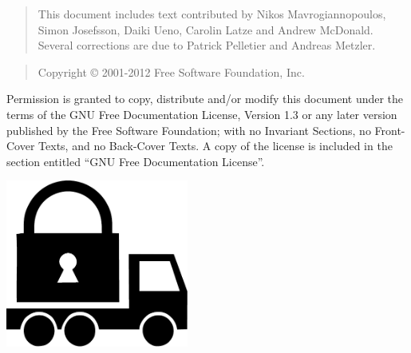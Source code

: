 \thispagestyle{empty}

\begin{quotation}
This document includes text contributed by
Nikos Mavrogiannopoulos, Simon Josefsson, Daiki Ueno, 
Carolin Latze and Andrew McDonald. Several corrections are due
to Patrick Pelletier and Andreas Metzler.
\end{quotation}



\begin{quotation}
Copyright \copyright{} 2001-2012 Free Software Foundation, Inc.
\end{quotation}

\begin{flushleft}
Permission is granted to copy, distribute and/or modify this document
under the terms of the GNU Free Documentation License, Version 1.3 or
any later version published by the Free Software Foundation; with no
Invariant Sections, no Front-Cover Texts, and no Back-Cover Texts.  A
copy of the license is included in the section entitled ``GNU Free
Documentation License''.
\end{flushleft}

\newpage
\thispagestyle{empty}

\begin{center}
\includegraphics[width=6cm]{../gnutls-logo.pdf}
\end{center}

